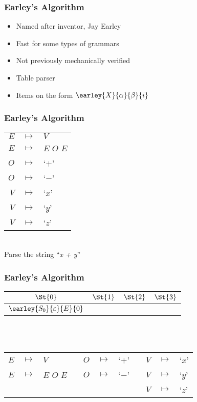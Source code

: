 \begin{frame}
	\frametitle{Earley's Algorithm}

	\begin{itemize}
		\item Named after inventor, Jay Earley
		\item Fast for some types of grammars
		\item Not previously mechanically verified
		\item Table parser
		\item Items on the form $\earley{X}{\alpha}{\beta}{i}$
	\end{itemize}
\end{frame}

\begin{frame}
	\frametitle{Earley's Algorithm}
	\centering
	\begin{tabular}{rcl}
		$E$ & $ \mapsto $ & $V$ \\
		$E$ & $ \mapsto $ & $E$ $O$ $E$ \\
		$O$ & $ \mapsto $ & `$+$' \\
		$O$ & $ \mapsto $ & `$-$' \\
		$V$ & $ \mapsto $ & `$x$' \\
		$V$ & $ \mapsto $ & `$y$' \\
		$V$ & $ \mapsto $ & `$z$'
	\end{tabular} \\ \vspace{1cm}
	Parse the string ``\emph{x + y}''
\end{frame}

\begin{frame}
	\frametitle{Earley's Algorithm}
	\centering
	\begin{tabular}{|c|c|c|c|}
		\hline
		$\St{0}$ & $\St{1}$ & $\St{2}$ & $\St{3}$ \\
		\hline
		$\earley{S_0}{\varepsilon}{E}{0}$ & & & \\
		\hline
	\end{tabular}

	\\~\\
	\vspace{0.5cm}
	\scriptsize
	\begin{tabular}{rclcrclcrcl}
		$E$ & $ \mapsto $ & $V$         && $O$ & $ \mapsto $ & `$+$' && $V$ & $ \mapsto $ & `$x$' \\
		$E$ & $ \mapsto $ & $E$ $O$ $E$ && $O$ & $ \mapsto $ & `$-$' && $V$ & $ \mapsto $ & `$y$' \\
		    &             &             &&     &             &       && $V$ & $ \mapsto $ & `$z$'
	\end{tabular}
\end{frame}

